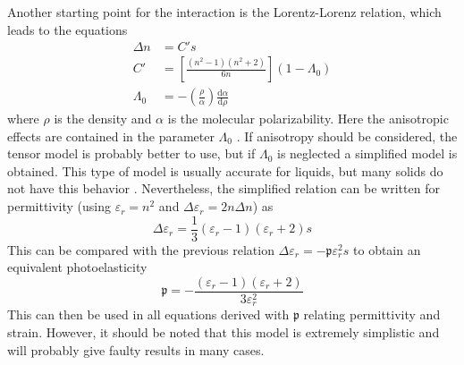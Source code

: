 \documentclass[10pt,a4paper,draft]{scrartcl}
\begin{document}
	Another starting point for the interaction is the Lorentz-Lorenz relation, which leads to the equations \cite{Korpel1988}
	\begin{align*}
	\Delta n &= C' s \\
	C' &= \left[ \frac{(n^2-1)(n^2+2)}{6n} \right](1-\Lambda_0) \\
	\Lambda_0 &= -\left( \frac{\rho}{\alpha} \right) \frac{\mathrm{d} \alpha}{\mathrm{d} \rho}
	\end{align*}
	where $\rho$ is the density and $\alpha$ is the molecular polarizability. Here the anisotropic effects are contained in the parameter $\Lambda_0$ \cite{Korpel1988}. If anisotropy should be considered, the tensor model is probably better to use, but if $\Lambda_0$ is neglected a simplified model is obtained. This type of model is usually accurate for liquids, but many solids do not have this behavior \cite{Korpel1988}. Nevertheless, the simplified relation can be written for permittivity (using $\varepsilon_r = n^2$ and $\Delta \varepsilon_r = 2n \Delta n$) as
	\begin{equation*}
	\Delta \varepsilon_r = \frac{1}{3} (\varepsilon_r - 1)(\varepsilon_r + 2) s
	\end{equation*}
	This can be compared with the previous relation $\Delta \varepsilon_r = -\mathfrak{p}\varepsilon_r^2 s$ to obtain an equivalent photoelasticity
	\begin{equation*}
	\mathfrak{p} = -\frac{(\varepsilon_r - 1)(\varepsilon_r + 2)}{3\varepsilon_r^2}
	\end{equation*}
	This can then be used in all equations derived with $\mathfrak{p}$ relating permittivity and strain. However, it should be noted that this model is extremely simplistic and will probably give faulty results in many cases.
	
	
\end{document}
